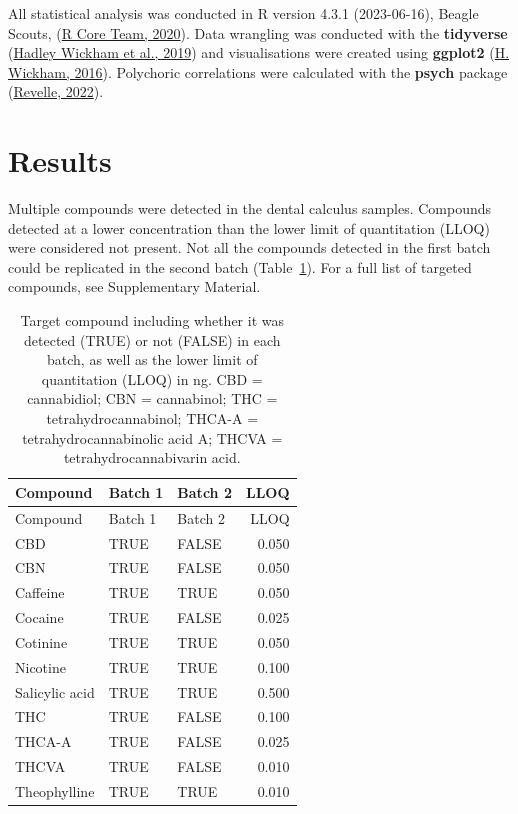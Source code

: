 \documentclass[
  letterpaper,
]{book}
\begin{document}
All statistical analysis was conducted in R version 4.3.1 (2023-06-16),
Beagle Scouts, (\protect\hyperlink{ref-Rbase}{R Core Team, 2020}). Data
wrangling was conducted with the \textbf{tidyverse}
(\protect\hyperlink{ref-tidyverse2019}{Hadley Wickham et al., 2019}) and
visualisations were created using \textbf{ggplot2}
(\protect\hyperlink{ref-ggplot2}{H. Wickham, 2016}). Polychoric
correlations were calculated with the \textbf{psych} package
(\protect\hyperlink{ref-Rpsych}{Revelle, 2022}).

\hypertarget{results-2}{%
\section{Results}\label{results-2}}

Multiple compounds were detected in the dental calculus samples.
Compounds detected at a lower concentration than the lower limit of
quantitation (LLOQ) were considered not present. Not all the compounds
detected in the first batch could be replicated in the second batch
(Table~\ref{tbl-compound-detect}). For a full list of targeted
compounds, see Supplementary Material.

\hypertarget{tbl-compound-detect}{}
\begin{longtable}[]{@{}lllr@{}}
\caption{\label{tbl-compound-detect}Target compound including whether it
was detected (TRUE) or not (FALSE) in each batch, as well as the lower
limit of quantitation (LLOQ) in ng. CBD = cannabidiol; CBN = cannabinol;
THC = tetrahydrocannabinol; THCA-A = tetrahydrocannabinolic acid A;
THCVA = tetrahydrocannabivarin acid.}\tabularnewline
\toprule\noalign{}
Compound & Batch 1 & Batch 2 & LLOQ \\
\midrule\noalign{}
\endfirsthead
\toprule\noalign{}
Compound & Batch 1 & Batch 2 & LLOQ \\
\midrule\noalign{}
\endhead
\bottomrule\noalign{}
\endlastfoot
CBD & TRUE & FALSE & 0.050 \\
CBN & TRUE & FALSE & 0.050 \\
Caffeine & TRUE & TRUE & 0.050 \\
Cocaine & TRUE & FALSE & 0.025 \\
Cotinine & TRUE & TRUE & 0.050 \\
Nicotine & TRUE & TRUE & 0.100 \\
Salicylic acid & TRUE & TRUE & 0.500 \\
THC & TRUE & FALSE & 0.100 \\
THCA-A & TRUE & FALSE & 0.025 \\
THCVA & TRUE & FALSE & 0.010 \\
Theophylline & TRUE & TRUE & 0.010 \\
\end{longtable}
\end{document}
